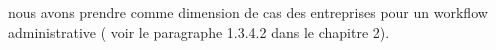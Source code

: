 
    nous avons prendre comme dimension de cas des entreprises pour un workflow administrative (  voir le paragraphe 1.3.4.2  dans le chapitre 2).  

